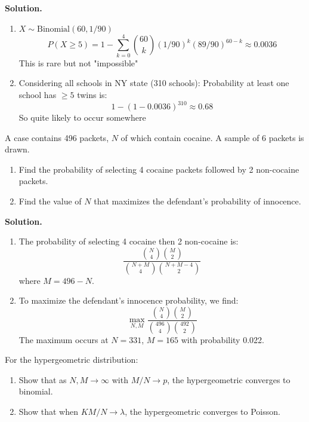 \noindent\textbf{Solution.}
\begin{enumerate}[label=(\alph*)]
\item \( X \sim \text{Binomial}(60, 1/90) \)
\[ P(X \geq 5) = 1 - \sum_{k=0}^4 \binom{60}{k} (1/90)^k (89/90)^{60-k} \approx 0.0036 \]
This is rare but not "impossible"

\item Considering all schools in NY state (310 schools):
Probability at least one school has \( \geq 5 \) twins is:
\[ 1 - (1 - 0.0036)^{310} \approx 0.68 \]
So quite likely to occur somewhere
\end{enumerate}

\begin{problembox}
A case contains 496 packets, \( N \) of which contain cocaine. A sample of 6 packets is drawn.
\begin{enumerate}[label=(\alph*)]
\item Find the probability of selecting 4 cocaine packets followed by 2 non-cocaine packets.
\item Find the value of \( N \) that maximizes the defendant's probability of innocence.
\end{enumerate}
\end{problembox}

\noindent\textbf{Solution.}
\begin{enumerate}[label=(\alph*)]
\item The probability of selecting 4 cocaine then 2 non-cocaine is:
\[
\frac{\binom{N}{4}\binom{M}{2}}{\binom{N+M}{4}\binom{N+M-4}{2}}
\]
where \( M = 496 - N \).

\item To maximize the defendant's innocence probability, we find:
\[
\max_{N,M} \frac{\binom{N}{4}\binom{M}{2}}{\binom{496}{4}\binom{492}{2}}
\]
The maximum occurs at \( N = 331 \), \( M = 165 \) with probability 0.022.
\end{enumerate}

\begin{problembox}
For the hypergeometric distribution:
\begin{enumerate}[label=(\alph*)]
\item Show that as \( N,M \to \infty \) with \( M/N \to p \), the hypergeometric converges to binomial.
\item Show that when \( KM/N \to \lambda \), the hypergeometric converges to Poisson.
\end{enumerate}
\end{problembox}

